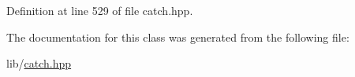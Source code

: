 Definition at line 529 of file catch.\+hpp.



The documentation for this class was generated from the following file\+:\begin{DoxyCompactItemize}
\item 
lib/\hyperlink{catch_8hpp}{catch.\+hpp}\end{DoxyCompactItemize}
